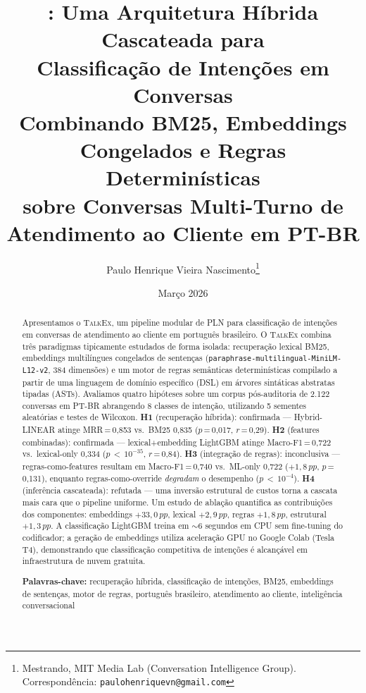 \documentclass[11pt]{article}
\title{%
\talkex{}: Uma Arquitetura Híbrida Cascateada para\\
Classificação de Intenções em Conversas\\[6pt]
\large Combinando BM25, Embeddings Congelados e Regras Determinísticas\\
sobre Conversas Multi-Turno de Atendimento ao Cliente em PT-BR%
}
\author{%
Paulo Henrique Vieira Nascimento\thanks{Mestrando, MIT Media Lab (Conversation Intelligence Group). Correspondência: \texttt{paulohenriquevn@gmail.com}}
}
\date{Março 2026}
\newcommand{\talkex}{\textsc{TalkEx}}
\newcommand{\macrof}{Macro-F1}
\newcommand{\pp}{\,pp}
\begin{document}
\maketitle

\begin{abstract}
Apresentamos o \talkex{}, um pipeline modular de PLN para classificação de intenções em conversas de atendimento ao cliente em português brasileiro. O \talkex{} combina três paradigmas tipicamente estudados de forma isolada: recuperação lexical BM25, embeddings multilíngues congelados de sentenças (\texttt{paraphrase-multilingual-MiniLM-L12-v2}, 384 dimensões) e um motor de regras semânticas determinísticas compilado a partir de uma linguagem de domínio específico (DSL) em árvores sintáticas abstratas tipadas (ASTs). Avaliamos quatro hipóteses sobre um corpus pós-auditoria de 2.122 conversas em PT-BR abrangendo 8 classes de intenção, utilizando 5 sementes aleatórias e testes de Wilcoxon. \textbf{H1} (recuperação híbrida): confirmada --- Hybrid-LINEAR atinge MRR\,=\,0,853 vs.\ BM25 0,835 ($p$\,=\,0,017, $r$\,=\,0,29). \textbf{H2} (features combinadas): confirmada --- lexical+embedding LightGBM atinge \macrof{}\,=\,0,722 vs.\ lexical-only 0,334 ($p$\,$<$\,$10^{-35}$, $r$\,=\,0,84). \textbf{H3} (integração de regras): inconclusiva --- regras-como-features resultam em \macrof{}\,=\,0,740 vs.\ ML-only 0,722 ($+1{,}8\pp$, $p$\,=\,0,131), enquanto regras-como-override \emph{degradam} o desempenho ($p$\,$<$\,$10^{-4}$). \textbf{H4} (inferência cascateada): refutada --- uma inversão estrutural de custos torna a cascata mais cara que o pipeline uniforme. Um estudo de ablação quantifica as contribuições dos componentes: embeddings $+33{,}0\pp$, lexical $+2{,}9\pp$, regras $+1{,}8\pp$, estrutural $+1{,}3\pp$. A classificação LightGBM treina em $\sim$6 segundos em CPU sem fine-tuning do codificador; a geração de embeddings utiliza aceleração GPU no Google Colab (Tesla T4), demonstrando que classificação competitiva de intenções é alcançável em infraestrutura de nuvem gratuita.

\medskip
\noindent\textbf{Palavras-chave:} recuperação híbrida, classificação de intenções, BM25, embeddings de sentenças, motor de regras, português brasileiro, atendimento ao cliente, inteligência conversacional
\end{abstract}

\end{document}
